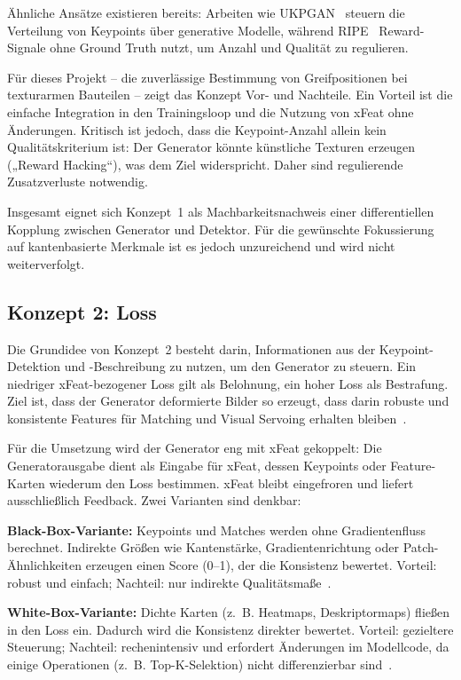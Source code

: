 Ähnliche Ansätze existieren bereits: Arbeiten wie UKPGAN~\cite{you2022ukpgan} steuern die Verteilung von Keypoints über generative Modelle, während RIPE~\cite{kunzel2025ripe} Reward-Signale ohne Ground Truth nutzt, um Anzahl und Qualität zu regulieren.  

Für dieses Projekt – die zuverlässige Bestimmung von Greifpositionen bei texturarmen Bauteilen – zeigt das Konzept Vor- und Nachteile. 
Ein Vorteil ist die einfache Integration in den Trainingsloop und die Nutzung von \ac{xFeat} ohne Änderungen. 
Kritisch ist jedoch, dass die Keypoint-Anzahl allein kein Qualitätskriterium ist: 
Der Generator könnte künstliche Texturen erzeugen („Reward Hacking“), was dem Ziel widerspricht. 
Daher sind regulierende Zusatzverluste notwendig.  

Insgesamt eignet sich Konzept~1 als Machbarkeitsnachweis einer differentiellen Kopplung zwischen Generator und Detektor. 
Für die gewünschte Fokussierung auf kantenbasierte Merkmale ist es jedoch unzureichend und wird nicht weiterverfolgt.


\subsection{Konzept 2: Loss}
\label{sec:Konzept2}
Die Grundidee von Konzept~2 besteht darin, Informationen aus der Keypoint-Detektion und -Beschreibung zu nutzen, um den Generator zu steuern. 
Ein niedriger \ac{xFeat}-bezogener Loss gilt als Belohnung, ein hoher Loss als Bestrafung. 
Ziel ist, dass der Generator deformierte Bilder so erzeugt, dass darin robuste und konsistente Features für Matching und Visual Servoing erhalten bleiben~\cite{potje2024xfeat}.  

Für die Umsetzung wird der Generator eng mit \ac{xFeat} gekoppelt: 
Die Generatorausgabe dient als Eingabe für \ac{xFeat}, dessen Keypoints oder Feature-Karten wiederum den Loss bestimmen. 
\ac{xFeat} bleibt eingefroren und liefert ausschließlich Feedback. 
Zwei Varianten sind denkbar:  

\textbf{Black-Box-Variante:} Keypoints und Matches werden ohne Gradientenfluss berechnet. 
Indirekte Größen wie Kantenstärke, Gradientenrichtung oder Patch-Ähnlichkeiten erzeugen einen Score (0–1), der die Konsistenz bewertet. 
Vorteil: robust und einfach; Nachteil: nur indirekte Qualitätsmaße~\cite{szeliski2022}.  

\textbf{White-Box-Variante:} Dichte Karten (z.~B. Heatmaps, Deskriptormaps) fließen in den Loss ein. 
Dadurch wird die Konsistenz direkter bewertet. 
Vorteil: gezieltere Steuerung; Nachteil: rechenintensiv und erfordert Änderungen im Modellcode, da einige Operationen (z.~B. Top-K-Selektion) nicht differenzierbar sind~\cite{detone2018superpoint,sarlin2020superglue}.  

